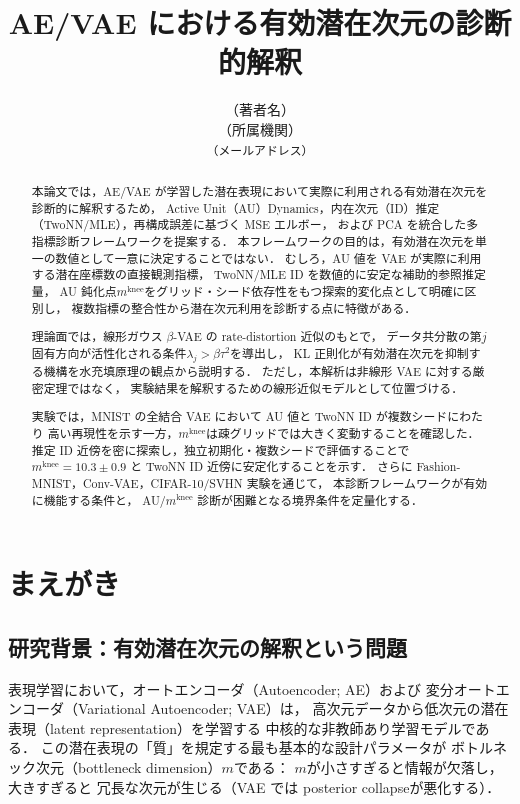 \documentclass[11pt,a4paper]{jsarticle}
\title{AE/VAE における有効潜在次元の診断的解釈}
\author{（著者名）\\
{\small （所属機関）}\\
{\small \texttt{（メールアドレス）}}}
\date{}
\newcommand{\mknee}{m^{\mathrm{knee}}}
\begin{document}
\maketitle

\begin{abstract}
本論文では，AE/VAE が学習した潜在表現において実際に利用される有効潜在次元を診断的に解釈するため，
Active Unit（AU）Dynamics，内在次元（ID）推定（TwoNN/MLE），再構成誤差に基づく MSE エルボー，
および PCA を統合した多指標診断フレームワークを提案する．
本フレームワークの目的は，有効潜在次元を単一の数値として一意に決定することではない．
むしろ，AU 値を VAE が実際に利用する潜在座標数の直接観測指標，
TwoNN/MLE ID を数値的に安定な補助的参照推定量，
AU 鈍化点$\mknee$をグリッド・シード依存性をもつ探索的変化点として明確に区別し，
複数指標の整合性から潜在次元利用を診断する点に特徴がある．

理論面では，線形ガウス $\beta$-VAE の rate-distortion 近似のもとで，
データ共分散の第$j$固有方向が活性化される条件$\lambda_j > \beta\tau^2$を導出し，
KL 正則化が有効潜在次元を抑制する機構を水充填原理の観点から説明する．
ただし，本解析は非線形 VAE に対する厳密定理ではなく，
実験結果を解釈するための線形近似モデルとして位置づける．

実験では，MNIST の全結合 VAE において AU 値と TwoNN ID が複数シードにわたり
高い再現性を示す一方，$\mknee$は疎グリッドでは大きく変動することを確認した．
推定 ID 近傍を密に探索し，独立初期化・複数シードで評価することで
$\mknee = 10.3 \pm 0.9$ と TwoNN ID 近傍に安定化することを示す．
さらに Fashion-MNIST，Conv-VAE，CIFAR-10/SVHN 実験を通じて，
本診断フレームワークが有効に機能する条件と，
AU/$\mknee$ 診断が困難となる境界条件を定量化する．
\end{abstract}

\section{まえがき}\label{sec:intro}

\subsection{研究背景：有効潜在次元の解釈という問題}\label{sec:intro_bg}

表現学習において，オートエンコーダ（Autoencoder; AE）および
変分オートエンコーダ（Variational Autoencoder; VAE）\cite{kingma2014vae}は，
高次元データから低次元の潜在表現（latent representation）を学習する
中核的な非教師あり学習モデルである\cite{bengio2013representation}．
この潜在表現の「質」を規定する最も基本的な設計パラメータが
ボトルネック次元（bottleneck dimension）$m$である：
$m$が小さすぎると情報が欠落し，大きすぎると
冗長な次元が生じる（VAE では posterior collapse\cite{lucas2019elbo}が悪化する）．
\end{document}
